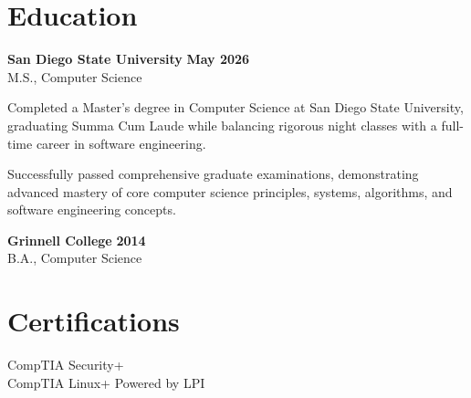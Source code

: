 \documentclass[10pt,letterpaper]{article}
\begin{document}
\section*{Education}

\textbf{San Diego State University} \hfill \textbf{May 2026} \\
M.S., Computer Science

\vspace{3pt}
Completed a Master's degree in Computer Science at San Diego State University, graduating Summa Cum Laude while balancing rigorous night classes with a full-time career in software engineering.

\vspace{3pt}
Successfully passed comprehensive graduate examinations, demonstrating advanced mastery of core computer science principles, systems, algorithms, and software engineering concepts.

\vspace{6pt}

\textbf{Grinnell College} \hfill \textbf{2014} \\
B.A., Computer Science

\section*{Certifications}

CompTIA Security+ \\
CompTIA Linux+ Powered by LPI
\end{document}
